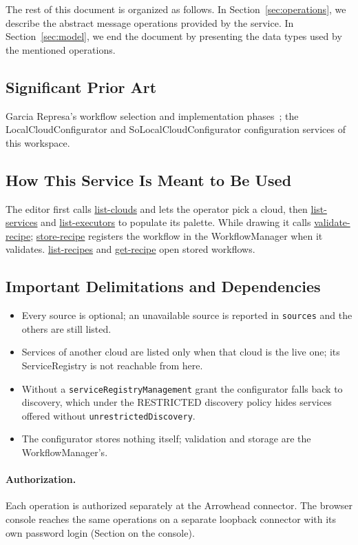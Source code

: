 \documentclass[a4paper]{arrowhead}
\newcommand{\oref}[1]{{\textcolor{ArrowheadBlue}{\hyperref[sec:operations:#1]{#1}}}}
\begin{document}
The rest of this document is organized as follows.
In Section~\ref{sec:operations}, we describe the abstract message operations provided by the service.
In Section~\ref{sec:model}, we end the document by presenting the data types used by the mentioned operations.

\subsection{Significant Prior Art}
Garcia Represa's workflow selection and implementation phases~\cite{represa2022}; the
LocalCloudConfigurator and SoLocalCloudConfigurator configuration services of this workspace.

\subsection{How This Service Is Meant to Be Used}
The editor first calls \oref{list-clouds} and lets the operator pick a cloud, then \oref{list-services} and
\oref{list-executors} to populate its palette. While drawing it calls \oref{validate-recipe}; \oref{store-recipe}
registers the workflow in the WorkflowManager when it validates. \oref{list-recipes} and \oref{get-recipe} open stored
workflows.

\subsection{Important Delimitations and Dependencies}
\label{sec:delimitations}
\begin{itemize}
\item Every source is optional; an unavailable source is reported in \texttt{sources} and the others are still listed.
\item Services of another cloud are listed only when that cloud is the live one; its ServiceRegistry is not reachable from here.
\item Without a \texttt{service\allowbreak{}Registry\allowbreak{}Management} grant the configurator falls back to discovery, which under the RESTRICTED discovery policy hides services offered without \texttt{unrestricted\allowbreak{}Discovery}.
\item The configurator stores nothing itself; validation and storage are the WorkflowManager's.
\end{itemize}

\paragraph{Authorization.} Each operation is authorized separately at the Arrowhead connector. The browser console reaches the same operations on a separate loopback connector with its own password login (Section on the console).
\end{document}
